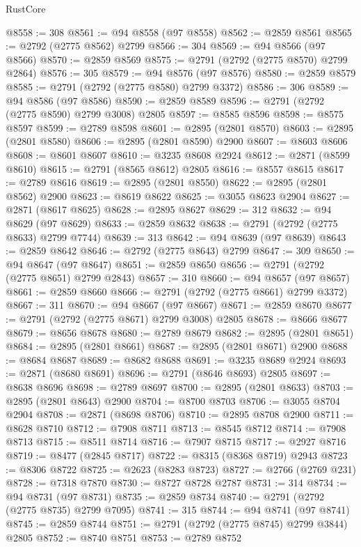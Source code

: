 \begin{lexlean}{RustCore}
\begin{coremodule}
@8558 := 308
@8561 := @94 @8558 (@97 @8558)
@8562 := @2859 @8561
@8565 := @2792 (@2775 @8562) @2799
@8566 := 304
@8569 := @94 @8566 (@97 @8566)
@8570 := @2859 @8569
@8575 := @2791 (@2792 (@2775 @8570) @2799 @2864)
@8576 := 305
@8579 := @94 @8576 (@97 @8576)
@8580 := @2859 @8579
@8585 := @2791 (@2792 (@2775 @8580) @2799 @3372)
@8586 := 306
@8589 := @94 @8586 (@97 @8586)
@8590 := @2859 @8589
@8596 := @2791 (@2792 (@2775 @8590) @2799 @3008) @2805
@8597 := @8585 @8596
@8598 := @8575 @8597
@8599 := @2789 @8598
@8601 := @2895 (@2801 @8570)
@8603 := @2895 (@2801 @8580)
@8606 := @2895 (@2801 @8590) @2900
@8607 := @8603 @8606
@8608 := @8601 @8607
@8610 := @3235 @8608 @2924
@8612 := @2871 (@8599 @8610)
@8615 := @2791 (@8565 @8612) @2805
@8616 := @8557 @8615
@8617 := @2789 @8616
@8619 := @2895 (@2801 @8550)
@8622 := @2895 (@2801 @8562) @2900
@8623 := @8619 @8622
@8625 := @3055 @8623 @2904
@8627 := @2871 (@8617 @8625)
@8628 := @2895 @8627
@8629 := 312
@8632 := @94 @8629 (@97 @8629)
@8633 := @2859 @8632
@8638 := @2791 (@2792 (@2775 @8633) @2799 @7744)
@8639 := 313
@8642 := @94 @8639 (@97 @8639)
@8643 := @2859 @8642
@8646 := @2792 (@2775 @8643) @2799
@8647 := 309
@8650 := @94 @8647 (@97 @8647)
@8651 := @2859 @8650
@8656 := @2791 (@2792 (@2775 @8651) @2799 @2843)
@8657 := 310
@8660 := @94 @8657 (@97 @8657)
@8661 := @2859 @8660
@8666 := @2791 (@2792 (@2775 @8661) @2799 @3372)
@8667 := 311
@8670 := @94 @8667 (@97 @8667)
@8671 := @2859 @8670
@8677 := @2791 (@2792 (@2775 @8671) @2799 @3008) @2805
@8678 := @8666 @8677
@8679 := @8656 @8678
@8680 := @2789 @8679
@8682 := @2895 (@2801 @8651)
@8684 := @2895 (@2801 @8661)
@8687 := @2895 (@2801 @8671) @2900
@8688 := @8684 @8687
@8689 := @8682 @8688
@8691 := @3235 @8689 @2924
@8693 := @2871 (@8680 @8691)
@8696 := @2791 (@8646 @8693) @2805
@8697 := @8638 @8696
@8698 := @2789 @8697
@8700 := @2895 (@2801 @8633)
@8703 := @2895 (@2801 @8643) @2900
@8704 := @8700 @8703
@8706 := @3055 @8704 @2904
@8708 := @2871 (@8698 @8706)
@8710 := @2895 @8708 @2900
@8711 := @8628 @8710
@8712 := @7908 @8711
@8713 := @8545 @8712
@8714 := @7908 @8713
@8715 := @8511 @8714
@8716 := @7907 @8715
@8717 := @2927 @8716
@8719 := @8477 (@2845 @8717)
@8722 := @8315 (@8368 @8719) @2943
@8723 := @8306 @8722
@8725 := @2623 (@8283 @8723)
@8727 := @2766 (@2769 @231)
@8728 := @7318 @7870
@8730 := @8727 @8728 @2787
@8731 := 314
@8734 := @94 @8731 (@97 @8731)
@8735 := @2859 @8734
@8740 := @2791 (@2792 (@2775 @8735) @2799 @7095)
@8741 := 315
@8744 := @94 @8741 (@97 @8741)
@8745 := @2859 @8744
@8751 := @2791 (@2792 (@2775 @8745) @2799 @3844) @2805
@8752 := @8740 @8751
@8753 := @2789 @8752

\end{coremodule}
\end{lexlean}
